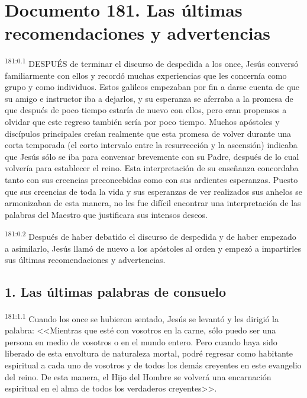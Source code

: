 \chapter{Documento 181. Las últimas recomendaciones y advertencias}
\par 
\textsuperscript{181:0.1} DESPUÉS de terminar el discurso de despedida a los once, Jesús conversó familiarmente con ellos y recordó muchas experiencias que les concernía como grupo y como individuos. Estos galileos empezaban por fin a darse cuenta de que su amigo e instructor iba a dejarlos, y su esperanza se aferraba a la promesa de que después de poco tiempo estaría de nuevo con ellos, pero eran propensos a olvidar que este regreso también sería por poco tiempo. Muchos apóstoles y discípulos principales creían realmente que esta promesa de volver durante una corta temporada (el corto intervalo entre la resurrección y la ascensión) indicaba que Jesús sólo se iba para conversar brevemente con su Padre, después de lo cual volvería para establecer el reino. Esta interpretación de su enseñanza concordaba tanto con sus creencias preconcebidas como con sus ardientes esperanzas. Puesto que sus creencias de toda la vida y sus esperanzas de ver realizados sus anhelos se armonizaban de esta manera, no les fue difícil encontrar una interpretación de las palabras del Maestro que justificara sus intensos deseos.

\par 
\textsuperscript{181:0.2} Después de haber debatido el discurso de despedida y de haber empezado a asimilarlo, Jesús llamó de nuevo a los apóstoles al orden y empezó a impartirles sus últimas recomendaciones y advertencias.

\section*{1. Las últimas palabras de consuelo}
\par 
\textsuperscript{181:1.1} Cuando los once se hubieron sentado, Jesús se levantó y les dirigió la palabra: <<Mientras que esté con vosotros en la carne, sólo puedo ser una persona en medio de vosotros o en el mundo entero. Pero cuando haya sido liberado de esta envoltura de naturaleza mortal, podré regresar como habitante espiritual a cada uno de vosotros y de todos los demás creyentes en este evangelio del reino. De esta manera, el Hijo del Hombre se volverá una encarnación espiritual en el alma de todos los verdaderos creyentes>>.

